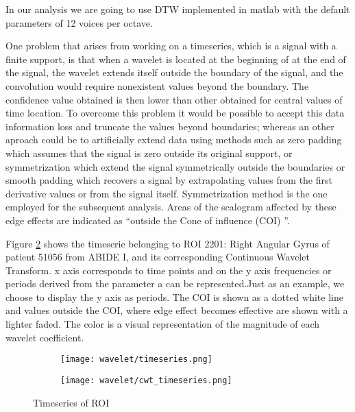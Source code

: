 \documentclass[a4paper,11pt]{article}
\begin{document}
In our analysis we are going to use DTW implemented in matlab with the default parameters of 12 voices per octave.


One problem that arises from working on a timeseries, which is a signal with a finite support, is that when a wavelet is located at the beginning of at the end of the signal, the wavelet extends itself outside the boundary of the signal, and the convolution would require nonexistent values beyond the boundary.
The confidence value obtained is then lower than other obtained for central values of time location.
To overcome this problem it would be possible to accept this data information loss and truncate the values beyond boundaries; whereas an other aproach could be to artificially extend data using methods such as zero padding which assumes that the signal is zero outside its original support, or symmetrization which extend the signal symmetrically outside the boundaries or smooth padding which recovers a signal by extrapolating values from the first derivative values or from the signal itself.
Symmetrization method is the one employed for the subsequent analysis.
Areas of the scalogram affected by these edge effects are indicated as \textquotedblleft outside the Cone of influence (COI) \textquotedblright.

Figure \ref{fig:cwt} shows the timeserie belonging to ROI 2201: Right Angular Gyrus of patient 51056 from ABIDE I, and its corresponding Continuous Wavelet Transform.
x axis corresponds to time points and on the y axis frequencies or periods derived from the parameter a can be represented.Just as an example, we choose to display the y axis as periods.
The COI is shown as a dotted white line and values outside the COI, where edge effect becomes effective are shown with a lighter faded.
The color is a visual representation of the magnitude of each wavelet coefficient.

\begin{figure}
\begin{subfigure}{0.5\textwidth}
\texttt{[image: wavelet/timeseries.png]}
\caption{}
\label{}
\end{subfigure}
\begin{subfigure}{0.5\textwidth}
\texttt{[image: wavelet/cwt\_timeseries.png]}
\end{subfigure}
\caption{Timeseries of ROI }
\label{fig:cwt}
\end{figure}
\end{document}
